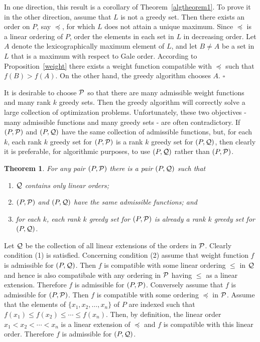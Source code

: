\documentclass[12pt]{article}
\newcommand{\p}{{\preceq}}
\newcommand{\Q}{{\cal Q}}
\renewcommand{\P}{{\cal P}}
\newcommand{\proof}{\noindent{\em Proof: }}
\newcommand{\B}{\bigskip}
\newcommand{\qed}{\hspace{\fill}$\square$}
\newtheorem{theorem}[equation]{Theorem}
\begin{document}
\proof In one direction, this result is a corollary of
Theorem~\ref{algtheorem1}.  To prove it in the other direction, assume
that $L$ is not a greedy set.  Then there exists an order on $P$,
say $\p$, for which $L$ does not attain a unique maximum.  Since
$\p$ is a linear ordering of $P$, order the elements in each set in $L$
in decreasing order.  Let $A$ denote the lexicographically
maximum element of $L$, and let $B \neq A$ be a set in $L$ that is a
maximum with respect to Gale order.  According to
Proposition~\ref{weight} there exists a weight function compatible
with $\p$ such that $f(B) > f(A)$.  On the other hand, the greedy
algorithm chooses $A$.  \qed \B

It is desirable to choose $\P$ so that there are many admissible weight
functions and many rank $k$ greedy sets.  Then the greedy algorithm
will correctly solve a large collection of optimization problems.
Unfortunately, these two objectives - many admissible functions and
many greedy sets - are often contradictory.  If $(P,\P)$ and $(P,\Q)$
have the same collection of admissible functions, but, for each $k$,
each rank $k$ greedy set for $(P,\P)$ is a rank $k$ greedy set for
$(P,\Q)$, then clearly it is preferable, for algorithmic purposes, to
use $(P,\Q)$ rather than $(P,\P)$.

\begin{theorem}\label{linear}  For any pair $(P,\P)$ there is a pair
$(P, \Q)$ such that
\begin{enumerate}
\item $\Q$ contains only linear orders;
\item $(P,\P)$ and $(P,\Q)$ have the same admissible functions; and
\item for each $k$, each rank $k$ greedy set for $(P,\P)$ is already
a rank $k$ greedy set for $(P,\Q)$.
\end{enumerate}
\end{theorem}

\proof Let $\Q$ be the collection of all linear extensions of the
orders in $\P$.  Clearly condition (1) is satisfied.  Concerning
condition (2) assume that weight function $f$ is admissible for
$(P,\Q)$.  Then $f$ is compatible with some linear ordering $\leq$ in
$\Q$ and hence is also compatibale with any ordering in $\P$ having
$\leq$ as a linear extension.  Therefore $f$ is admissible for
$(P,\P)$.  Conversely assume that $f$ is admissible for $(P,\P)$.
Then $f$ is compatible with some ordering $\p$ in $\P$.  Assume that
the elements of $\{x_1, x_2, \dots , x_n\}$ of $P$ are indexed such
that $f(x_1) \leq f(x_2) \leq \cdots \leq f(x_n)$.  Then, by
definition, the linear order $x_1 < x_2 < \cdots < x_n$ is a linear
extension of $\p$ and $f$ is compatible with this linear order.
Therefore $f$ is admissible for $(P,\Q)$.
\end{document}

